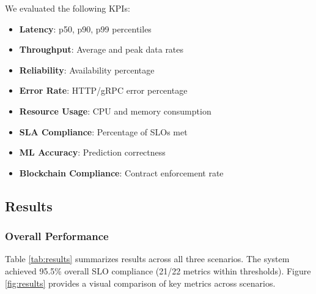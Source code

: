 \documentclass[review]{elsarticle}
\begin{document}
We evaluated the following KPIs:
\begin{itemize}
    \item \textbf{Latency}: p50, p90, p99 percentiles
    \item \textbf{Throughput}: Average and peak data rates
    \item \textbf{Reliability}: Availability percentage
    \item \textbf{Error Rate}: HTTP/gRPC error percentage
    \item \textbf{Resource Usage}: CPU and memory consumption
    \item \textbf{SLA Compliance}: Percentage of SLOs met
    \item \textbf{ML Accuracy}: Prediction correctness
    \item \textbf{Blockchain Compliance}: Contract enforcement rate
\end{itemize}

\subsection{Results}

\subsubsection{Overall Performance}

Table \ref{tab:results} summarizes results across all three scenarios. The system achieved 95.5\% overall SLO compliance (21/22 metrics within thresholds). Figure \ref{fig:results} provides a visual comparison of key metrics across scenarios.

\begin{table}[h]
\centering
\caption{Experimental Results Summary}
\label{tab:results}
\end{table}
\end{document}
